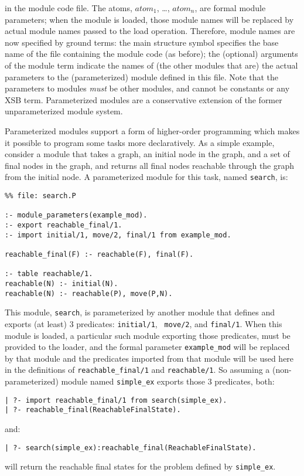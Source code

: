 \noindent in the module code file.  The atoms, $atom_1$, \ldots,
$atom_n$, are formal module parameters; when the module is loaded,
those module names will be replaced by actual module names passed to
the load operation.  Therefore, module names are now specified by
ground terms: the main structure symbol specifies the base name of the
file containing the module code (as before); the (optional) arguments
of the module term indicate the names of (the other modules that are)
the actual parameters to the (parameterized) module defined in this
file.  Note that the parameters to modules {\em must} be other
modules, and cannot be constants or any XSB term.  Parameterized
modules are a conservative extension of the former unparameterized
module system.

Parameterized modules support a form of higher-order programming which
makes it possible to program some tasks more declaratively.  As a
simple example, consider a module that takes a graph, an initial node
in the graph, and a set of final nodes in the graph, and returns all
final nodes reachable through the graph from the initial node.  A
parameterized module for this task, named {\tt search}, is:
\begin{verbatim}
%% file: search.P

:- module_parameters(example_mod).
:- export reachable_final/1.
:- import initial/1, move/2, final/1 from example_mod.

reachable_final(F) :- reachable(F), final(F).

:- table reachable/1.
reachable(N) :- initial(N).
reachable(N) :- reachable(P), move(P,N).
\end{verbatim}
This module, {\tt search}, is parameterized by another module that
defines and exports (at least) 3 predicates: {\tt initial/1}, {\tt
  move/2}, and {\tt final/1}.  When this module is loaded, a
particular such module exporting those predicates, must be provided to
the loader, and the formal parameter {\tt example\_mod} will be
replaced by that module and the predicates imported from that module
will be used here in the definitions of {\tt reachable\_final/1} and
{\tt reachable/1}.  So assuming a (non-parameterized) module named
{\tt simple\_ex} exports those 3 predicates, both:
\begin{verbatim}
| ?- import reachable_final/1 from search(simple_ex).
| ?- reachable_final(ReachableFinalState).
\end{verbatim}
and:
\begin{verbatim}
| ?- search(simple_ex):reachable_final(ReachableFinalState).
\end{verbatim}
will return the reachable final states for the problem defined by
{\tt simple\_ex}.

